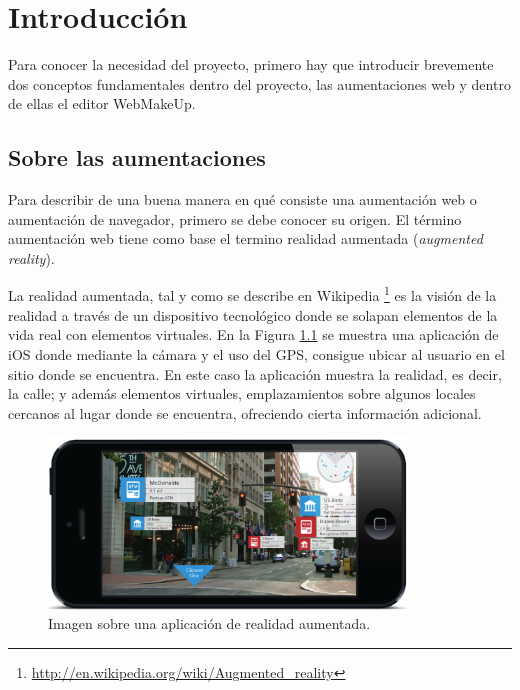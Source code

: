 \chapter{Introducción}
\label{ch:introduccion}

Para conocer la necesidad del proyecto, primero hay que introducir brevemente dos conceptos fundamentales dentro del proyecto, las aumentaciones web y dentro de ellas el editor WebMakeUp.

\section{Sobre las aumentaciones}
\label{sec:SobreAumentaciones}

Para describir de una buena manera en qué consiste una aumentación web o aumentación de navegador, primero se debe conocer su origen. El término aumentación web tiene como base el termino realidad aumentada (\emph{augmented reality}).

La realidad aumentada, tal y como se describe en Wikipedia \footnote{\url{http://en.wikipedia.org/wiki/Augmented_reality}} es la visión de la realidad a través de un dispositivo tecnológico donde se solapan elementos de la vida real con elementos virtuales. En la Figura \ref{fig:1-AugmentedReality} se muestra una aplicación de iOS donde mediante la cámara y el uso del GPS, consigue ubicar al usuario en el sitio donde se encuentra. En este caso la aplicación muestra la realidad, es decir, la calle; y además elementos virtuales, emplazamientos sobre algunos locales cercanos al lugar donde se encuentra, ofreciendo cierta información adicional.

\begin{figure}
\begin{center}
\includegraphics[width=0.85\textwidth]{figs/1-AugmentedReality.png}
\caption{Imagen sobre una aplicación de realidad aumentada.}
\label{fig:1-AugmentedReality}
\end{center}
\end{figure}

